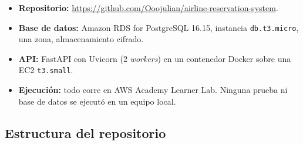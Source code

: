 \documentclass[10pt,letterpaper]{article}
\begin{document}
\begin{itemize}
  \item \textbf{Repositorio:} \url{https://github.com/Ooojulian/airline-reservation-system}.
  \item \textbf{Base de datos:} Amazon RDS for PostgreSQL 16.15, instancia \texttt{db.t3.micro}, una zona, almacenamiento cifrado.
  \item \textbf{API:} FastAPI con Uvicorn (2 \emph{workers}) en un contenedor Docker sobre una EC2 \texttt{t3.small}.
  \item \textbf{Ejecución:} todo corre en AWS Academy Learner Lab. Ninguna prueba ni base de datos se ejecutó en un equipo local.
\end{itemize}

\subsection{Estructura del repositorio}
\end{document}
